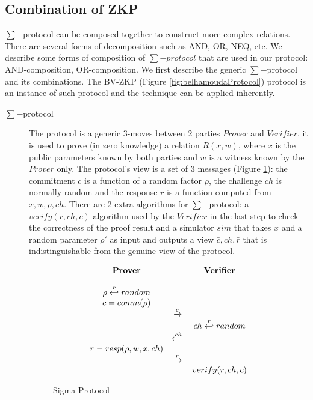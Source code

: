 \subsection{Combination of ZKP}
\label{sec:combination-zkp}
$\sum-$protocol can be composed together to construct more complex relations.
There are several forms of decomposition such as AND, OR, NEQ, etc.  We describe
some forms of composition of \(\sum-protocol\) that are used in our protocol:
AND-composition, OR-composition. We first describe the generic \(\sum-\)protocol
and its combinations. The BV-ZKP (Figure \ref{fig:belhamoudaProtocol}) protocol
is an instance of such protocol and the technique can be applied inherently.
\begin{description}
\item[$\sum-$protocol] The protocol is a generic 3-moves between 2 parties
  \(Prover\) and \(Verifier\), it is used to prove (in zero knowledge) a
  relation \(R(x,w)\), where \(x\) is the public parameters known by both
  parties and \(w\) is a witness known by the \(Prover\) only. The protocol's
  view is a set of 3 messages (Figure \ref{fig:sigmaProtocol}): the commitment
  \(c\) is a function of a random factor \(\rho\), the challenge \(ch\) is
  normally random and the response \(r\) is a function computed from
  \(x, w, \rho, ch\). There are 2 extra algorithms for \(\sum-\)protocol: a
  \(verify(r,ch,c)\) algorithm used by the \(Verifier\) in the last step to
  check the correctness of the proof result and a simulator \(sim\) that takes
  \(x\) and a random parameter \(\rho'\) as input and outputs a view
  \(\bar{c},\bar{ch},\bar{r}\) that is indistinguishable from the genuine view
  of the protocol.
  \begin{figure}[h!]
    \centering
    \begin{equation*}
      \begin{array}{c c c}
        \text{\textbf{Prover}} & & \text{\textbf{Verifier}} \\
        \\
        \rho \stackrel{r}{\hookleftarrow} random & & \\
        c = comm(\rho) & & \\
                               & \xrightarrow{c} & \\
                               & & ch \stackrel{r}{\hookleftarrow} random \\
                               & \xleftarrow{ch} & \\
        r = resp(\rho,w,x,ch) & & \\
                               & \xrightarrow{r} & \\
                               & & verify(r, ch, c)\\
      \end{array}
    \end{equation*}
    \caption{Sigma Protocol}
    \label{fig:sigmaProtocol}
  \end{figure}
  
\end{description}


